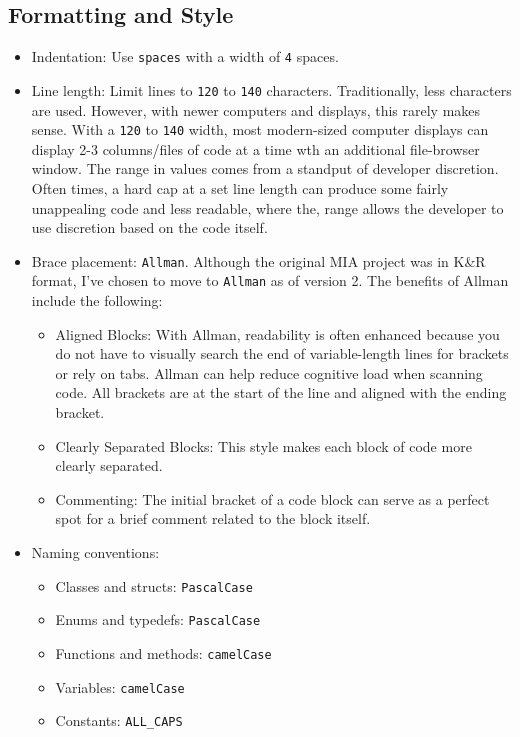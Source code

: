 \subsection{Formatting and Style}
\begin{itemize}
    \item Indentation: Use \texttt{spaces} with a width of \texttt{4} spaces.
    \item Line length: Limit lines to \texttt{120} to \texttt{140} characters. Traditionally, less characters are used. However, with newer computers and displays, this rarely makes sense. With a \texttt{120} to \texttt{140} width, most modern-sized computer displays can display 2-3 columns/files of code at a time wth an additional file-browser window. The range in values comes from a standput of developer discretion. Often times, a hard cap at a set line length can produce some fairly unappealing code and less readable, where the, range allows the developer to use discretion based on the code itself. 
    \item Brace placement: \texttt{Allman}. Although the original MIA project was in K\&R format, I've chosen to move to \texttt{Allman} as of version 2. The benefits of Allman include the following:    
    \begin{itemize}
        \item Aligned Blocks: With Allman, readability is often enhanced because you do not have to visually search the end of variable-length lines for brackets or rely on tabs. Allman can help reduce cognitive load when scanning code. All brackets are at the start of the line and aligned with the ending bracket. 
        \item Clearly Separated Blocks: This style makes each block of code more clearly separated.
        \item Commenting: The initial bracket of a code block can serve as a perfect spot for a brief comment related to the block itself. 
    \end{itemize}
    \item Naming conventions:
    \begin{itemize}
        \item Classes and structs: \texttt{PascalCase}
        \item Enums and typedefs: \texttt{PascalCase}
        \item Functions and methods: \texttt{camelCase}
        \item Variables: \texttt{camelCase}
        \item Constants: \texttt{ALL\_CAPS} 
    \end{itemize}
\end{itemize}

